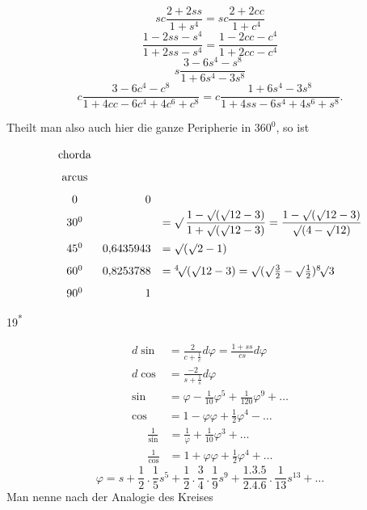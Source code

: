 \par\medskip{}
\[sc\frac{2+2ss}{1+s^4}=sc\frac{2+2cc}{1+c^4}\]
\[\frac{1-2ss-s^4}{1+2ss-s^4}=\frac{1-2cc-c^4}{1+2cc-c^4}\]
\[s\frac{3-6s^4-s^8}{1+6s^4-3s^8}\]
\[c\frac{3-6c^4-c^8}{1+4cc-6c^4+4c^6+c^8}=c\frac{1+6s^4-3s^8}{1+4ss-6s^4+4s^6+s^8}.\]
\ClosingRule
\clearpage
{}
\noindent{\small [S. 20]}
\par\noindent\hspace*{\parindent}Theilt man also auch hier die ganze Peripherie in $360^0$, so ist
\[\setlength{\arraycolsep}{5pt}\renewcommand{\arraystretch}{1.65}\begin{array}{crl}
\text{chorda}&&\\\text{arcus}&&\\
0&0&\\
30^0&&=\mathop{\surd}\nolimits\dfrac{1-\surd(\surd12-3)}{1+\surd(\surd12-3)}=\dfrac{1-\surd(\surd12-3)}{\surd(4-\surd12)}\\
45^0&0{,}6435943&=\surd(\surd2-1)\\
60^0&0{,}8253788&={}^4\!\surd(\surd12-3)=\surd(\surd\tfrac32-\surd\tfrac12){}^8\!\surd3\\
90^0&1&
\end{array}\]
\ClosingRule
\vfill\noindent\hfill19\textsuperscript{*}\par
\clearpage
{}
\noindent{\small [S. 20--21]}
\[\begin{aligned}
d\sin&=\frac{2}{c+\frac1c}d\varphi=\frac{1+ss}{cs}d\varphi\\[5pt]
d\cos&=\frac{-2}{s+\frac1s}d\varphi\\[5pt]
\sin&=\varphi-\frac1{10}\varphi^5+\frac1{120}\varphi^9+\ldots\\
\cos&=1-\varphi\varphi+\tfrac12\varphi^4-\ldots
\end{aligned}\]
\[\begin{aligned}
\frac1{\sin}&=\frac1\varphi+\frac1{10}\varphi^3+\ldots\\
\frac1{\cos}&=1+\varphi\varphi+\frac12\varphi^4+\ldots
\end{aligned}\]
\[\varphi=s+\frac12\mathpunct{.}\frac15s^5+\frac12\mathpunct{.}\frac34\mathpunct{.}\frac19s^9+\frac{1.3.5}{2.4.6}\mathpunct{.}\frac1{13}s^{13}+\ldots\]
\noindent Man nenne nach der Analogie des Kreises
